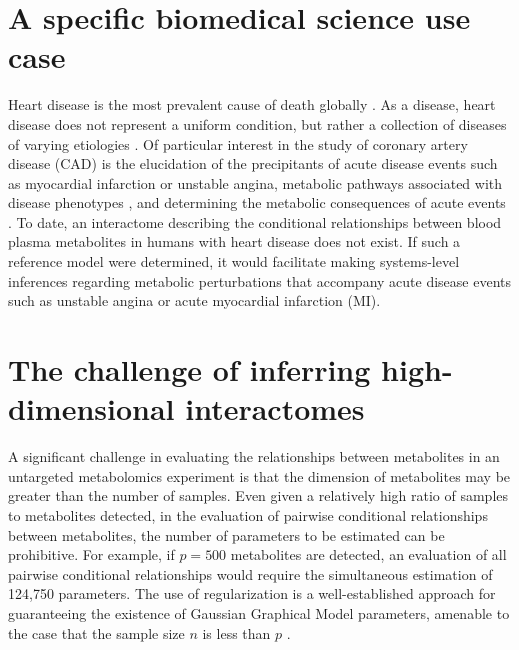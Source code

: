 \begin{DoubleSpace*}
\section{A specific biomedical science use case}
Heart disease is the most prevalent cause of death globally \cite{benjamin2017}. As a disease, heart disease does not represent a uniform condition, but rather a collection of diseases of varying etiologies \cite{kasper2015}. Of particular interest in the study of coronary artery disease (CAD) is the elucidation of the precipitants of acute disease events such as myocardial infarction \cite{arbab2015} or unstable angina, metabolic pathways associated with disease phenotypes \cite{fan2016}, and determining the metabolic consequences of acute events \cite{trainor2017}. To date, an interactome describing the conditional relationships between blood plasma metabolites in humans with heart disease does not exist. If such a reference model were determined, it would facilitate making systems-level inferences regarding metabolic perturbations that accompany acute disease events such as unstable angina or acute myocardial infarction (MI).

\section{The challenge of inferring high-dimensional interactomes}
A significant challenge in evaluating the relationships between metabolites in an untargeted metabolomics experiment is that the dimension of metabolites may be greater than the number of samples. Even given a relatively high ratio of samples to metabolites detected, in the evaluation of pairwise conditional relationships between metabolites, the number of parameters to be estimated can be prohibitive. For example, if $p=500$ metabolites are detected, an evaluation of all pairwise conditional relationships would require the simultaneous estimation of 124,750 parameters. The use of regularization is a well-established approach for guaranteeing the existence of Gaussian Graphical Model parameters, amenable to the case that the sample size $n$ is less than $p$ \cite{banerjee2008,fan2009,friedman2007,meinshausen2006, yuan2007}.


\end{DoubleSpace*}

